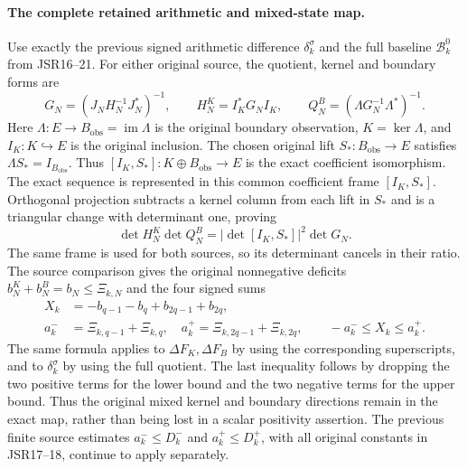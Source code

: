 \documentclass[11pt,a4paper]{article}
\begin{document}
\paragraph{The complete retained arithmetic and mixed-state map.}
Use exactly the previous signed arithmetic difference
$\delta_k^\sigma$ and the full baseline $\mathcal B_k^0$ from JSR16--21.
For either original source, the quotient, kernel and boundary forms
are
\[
 G_N=(J_NH_N^{-1}J_N^*)^{-1},\qquad
 H_N^K=I_K^*G_NI_K,\qquad
 Q_N^B=(\Lambda G_N^{-1}\Lambda^*)^{-1}.
 \tag{WGR7}
\]
Here $\Lambda:E\to B_{\mathrm{obs}}=\operatorname{im}\Lambda$ is the
original boundary observation, $K=\ker\Lambda$, and $I_K:K\hookrightarrow E$
is the original inclusion. The chosen original lift
$S_*:B_{\mathrm{obs}}\to E$ satisfies $\Lambda S_*=I_{B_{\mathrm{obs}}}$.
Thus $[I_K,S_*]:K\oplus B_{\mathrm{obs}}\to E$ is the exact
coefficient isomorphism. The exact sequence is represented in this common
coefficient frame $[I_K,S_*]$. Orthogonal projection subtracts a kernel
column from each lift in $S_*$ and is a triangular change with
determinant one, proving
\[
 \det H_N^K\det Q_N^B
       =|\det[I_K,S_*]|^2\det G_N.
 \tag{WGR8}
\]
The same frame is used for both sources, so its determinant cancels
in their ratio. The source comparison gives the original nonnegative
deficits $b_N^K+b_N^B=b_N\le\Xi_{k,N}$ and the four signed sums
\[
 \begin{aligned}
 X_k&=-b_{q-1}-b_q+b_{2q-1}+b_{2q},\\
 a_k^-&=\Xi_{k,q-1}+\Xi_{k,q},\quad
 a_k^+=\Xi_{k,2q-1}+\Xi_{k,2q},\qquad
 -a_k^-\le X_k\le a_k^+ .
 \end{aligned}\tag{WGR9}
\]
The same formula applies to $\Delta F_K,\Delta F_B$ by using the
corresponding superscripts, and to $\delta_k^\sigma$ by using the
full quotient. The last inequality follows by dropping the two
positive terms for the lower bound and the two negative terms for
the upper bound. Thus the original mixed kernel and boundary
directions remain in the exact map, rather than being lost in a
scalar positivity assertion. The previous finite source estimates
$a_k^-\le D_k^-$ and $a_k^+\le D_k^+$, with all original constants
in JSR17--18, continue to apply separately.
\end{document}
